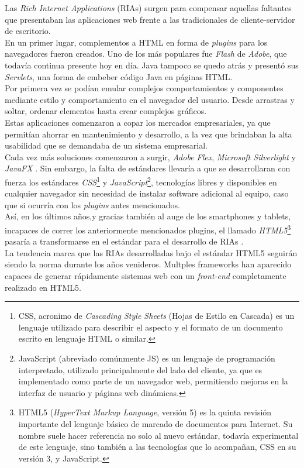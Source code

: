 Las \emph{Rich Internet Applications} (RIAs) surgen para compensar aquellas faltantes que
presentaban las aplicaciones web frente a las tradicionales de cliente-servidor de
escritorio.\\
En un primer lugar, complementos a HTML en forma de \emph{plugins} para los navegadores
fueron creados. Uno de los más populares fue \emph{Flash} de \emph{Adobe}, que todavía
continua presente hoy en día. Java tampoco se quedo atrás y presentó sus \emph{Servlets},
una forma de embeber código Java en páginas HTML.\\
Por primera vez se podían emular complejos comportamientos y componentes mediante estilo
y comportamiento en el navegador del usuario. Desde arrastras y soltar, ordenar elementos
hasta crear complejos gráficos.\\
Estas aplicaciones comenzaron a copar los mercados empresariales, ya que permitían ahorrar
en mantenimiento y desarrollo, a la vez que brindaban la alta usabilidad que se demandaba
de un sistema empresarial.\\
Cada vez más soluciones comenzaron a surgir, \emph{Adobe Flex}, \emph{Microsoft Silverlight}
y \emph{JavaFX} . Sin embargo, la falta de estándares llevaría a que
se desarrollaran con fuerza los estándares \emph{CSS}\footnote{
	CSS, acronimo de \emph{\textsc{C}ascading \textsc{S}tyle \textsc{S}heets} (Hojas de
	Estilo en Cascada) es un lenguaje utilizado para describir el aspecto y el formato de un
	documento escrito en lenguaje HTML o similar.
} y \emph{JavaScript}\footnote{
	JavaScript (abreviado comúnmente JS) es un lenguaje de programación interpretado,
	utilizado principalmente del lado del cliente, ya que es implementado como parte de un
	navegador web, permitiendo mejoras en la interfaz de usuario y páginas web dinámicas.
}, tecnologías libres y disponibles en cualquier navegador sin necesidad de instalar
software adicional al equipo, caso que si ocurría con los \emph{plugins} antes mencionados.\\
Así, en los últimos años,y gracias también al auge de los smartphones y tablets, incapaces
de correr los anteriormente mencionados plugins, el llamado \emph{HTML5}\footnote{
	HTML5 (\emph{\textsc{H}yperText \textsc{M}arkup \textsc{L}anguage}, versión 5) es la
	quinta revisión importante del lenguaje básico de marcado de documentos para Internet.
	Su nombre suele hacer referencia no solo al nuevo estándar, todavía experimental de este
	lenguaje, sino también a las tecnologías que lo acompañan, CSS en su versión 3, y
	JavaScript.
} pasaría a transformarse en el estándar para el desarrollo de RIAs .\\
La tendencia marca que las RIAs desarrolladas bajo el estándar HTML5 seguirán siendo la
norma durante los años venideros. Multples frameworks han aparecido capaces de generar
rápidamente sistemas web con un \emph{front-end} completamente realizado en HTML5.\\




